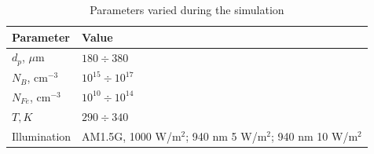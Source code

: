 \documentclass[a4paper,fleqn]{cas-sc}
\begin{document}
%
%
%
%
%
%
%
\begin{table}[width=.8\textwidth, cols=2,pos=h]
\caption{Parameters varied during the simulation}\label{table1}
\begin{tabular*}{\tblwidth}{@{}LL@{}}
\toprule
  Parameter & Value \\ %
\midrule
 $d_p$, $\mu$m                & $180\div 380$\\
 $N_B$, $\mathrm{cm}^{-3}$    & $10^{15}\div 10^{17}$\\
 $N_{Fe}$, $\mathrm{cm}^{-3}$ & $10^{10}\div 10^{14}$\\
 $T, K$                       & $290\div 340$\\
 Illumination                 & AM1.5G, 1000 W/$\mathrm{m}^{2}$; 940 nm 5 W/$\mathrm{m}^{2}$; 940 nm 10 W/$\mathrm{m}^{2}$\\
\bottomrule
\end{tabular*}
\end{table}
\end{document}
